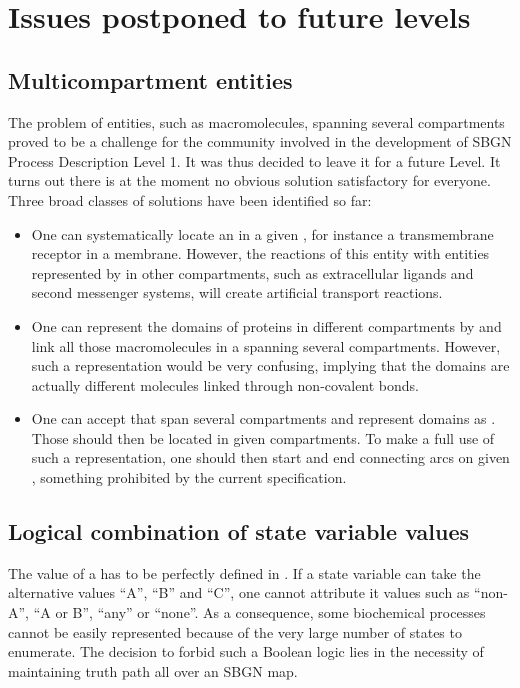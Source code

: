 \chapter{Issues postponed to future levels}\label{sec:postponed}

\section{Multicompartment entities}
\label{sec: unresolved multi-comp ents}

The problem of entities, such as macromolecules, spanning several compartments proved to be a challenge for the community involved in the development of SBGN Process Description Level 1. It was thus decided to leave it for a future Level. It turns out there is at the moment no obvious solution satisfactory for everyone. Three broad classes of solutions have been identified so far:

\begin{itemize}
\item One can systematically locate an  in a given , for instance a transmembrane receptor in a membrane. However, the reactions of this entity with entities represented by  in other compartments, such as extracellular ligands and second messenger systems, will create artificial transport reactions.
\item One can represent the domains of proteins in different compartments by  and link all those macromolecules in a  spanning several compartments. However, such a representation would be very confusing, implying that the domains are actually different molecules linked through non-covalent bonds.
\item One can accept  that span several compartments and represent domains as . Those  should then be located in given compartments. To make a full use of such a representation, one should then start and end connecting arcs on given , something prohibited by the current specification.
\end{itemize}

\section{Logical combination of state variable values}

The value of a  has to be perfectly defined in \SBGNPDLone. If a state variable can take the alternative values ``A'', ``B'' and ``C'',  one cannot attribute it values such as ``non-A'', ``A or B'', ``any'' or ``none''. As a consequence, some biochemical processes cannot be easily represented because of the very large number of states to enumerate. The decision to forbid such a Boolean logic lies in the necessity of maintaining truth path all over an SBGN map. 

